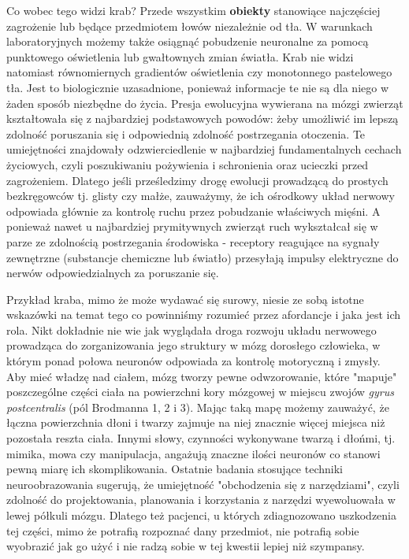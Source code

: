 \documentclass[12pt]{article}
\begin{document}
Co wobec tego widzi krab? Przede wszystkim \textbf{obiekty} stanowiące najczęściej zagrożenie lub będące przedmiotem łowów niezależnie od tła. W warunkach laboratoryjnych możemy także osiągnąć pobudzenie neuronalne za pomocą punktowego oświetlenia lub gwałtownych zmian światła. Krab nie widzi natomiast równomiernych gradientów oświetlenia czy monotonnego pastelowego tła. Jest to biologicznie uzasadnione, ponieważ informacje te nie są dla niego w żaden sposób niezbędne do życia. Presja ewolucyjna wywierana na mózgi zwierząt kształtowała się z najbardziej podstawowych powodów: żeby umożliwić im lepszą zdolność poruszania się i odpowiednią zdolność postrzegania otoczenia. Te umiejętności znajdowały odzwierciedlenie w najbardziej fundamentalnych cechach życiowych, czyli poszukiwaniu pożywienia i schronienia oraz ucieczki przed zagrożeniem. Dlatego jeśli prześledzimy drogę ewolucji prowadzącą do prostych bezkręgowców tj. glisty czy małże, zauważymy, że ich ośrodkowy układ nerwowy odpowiada głównie za kontrolę ruchu przez pobudzanie właściwych mięśni. A ponieważ nawet u najbardziej prymitywnych zwierząt ruch wykształcał się w parze ze zdolnością postrzegania środowiska - receptory reagujące na sygnały zewnętrzne (substancje chemiczne lub światło) przesyłają impulsy elektryczne do nerwów odpowiedzialnych za poruszanie się. 

Przykład kraba, mimo że może wydawać się surowy, niesie ze sobą istotne wskazówki na temat tego co powinniśmy rozumieć przez afordancje i jaka jest ich rola. Nikt dokładnie nie wie jak wyglądała droga rozwoju układu nerwowego prowadząca do zorganizowania jego struktury w mózg dorosłego człowieka, w którym ponad połowa neuronów odpowiada za kontrolę motoryczną i zmysły. Aby mieć władzę nad ciałem, mózg tworzy pewne odwzorowanie, które "mapuje" poszczególne części ciała na powierzchni kory mózgowej w miejscu zwojów \emph{gyrus postcentralis} (pól Brodmanna 1, 2 i 3). Mając taką mapę możemy zauważyć, że łączna powierzchnia dłoni i twarzy zajmuje na niej znacznie więcej miejsca niż pozostała reszta ciała. Innymi słowy, czynności wykonywane twarzą i dłońmi, tj. mimika, mowa czy manipulacja, angażują znaczne ilości neuronów co stanowi pewną miarę ich skomplikowania. Ostatnie badania stosujące techniki neuroobrazowania sugerują, że umiejętność "obchodzenia się z narzędziami", czyli zdolność do projektowania, planowania i korzystania z narzędzi wyewoluowała w lewej półkuli mózgu. Dlatego też pacjenci, u których zdiagnozowano uszkodzenia tej części, mimo że potrafią rozpoznać dany przedmiot, nie potrafią sobie wyobrazić jak go użyć i nie radzą sobie w tej kwestii lepiej niż szympansy. 
\end{document}
